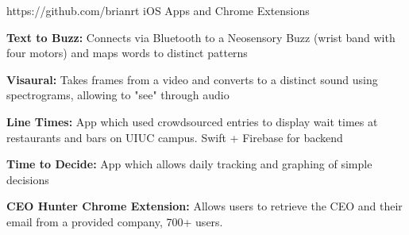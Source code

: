 

\begin{cventries}

  \cventry
    {https://github.com/brianrt} %
    {iOS Apps and Chrome Extensions} %
    {} %
    {} %
    {
      \begin{cvitems} %
        \item {\textbf{Text to Buzz:} Connects via Bluetooth to a Neosensory Buzz (wrist band with four motors) and maps words to distinct patterns}
        \item {\textbf{Visaural:} Takes frames from a video and converts to a distinct sound using spectrograms, allowing to "see" through audio}
        \item {\textbf{Line Times:} App which used crowdsourced entries to display wait times at restaurants and bars on UIUC campus. Swift + Firebase for backend}
        \item {\textbf{Time to Decide:}  App which allows daily tracking and graphing of simple decisions}
        \item {\textbf{CEO Hunter Chrome Extension:}  Allows users to retrieve the CEO and their email from a provided company, 700+ users.}
      \end{cvitems}
    }

\end{cventries}
